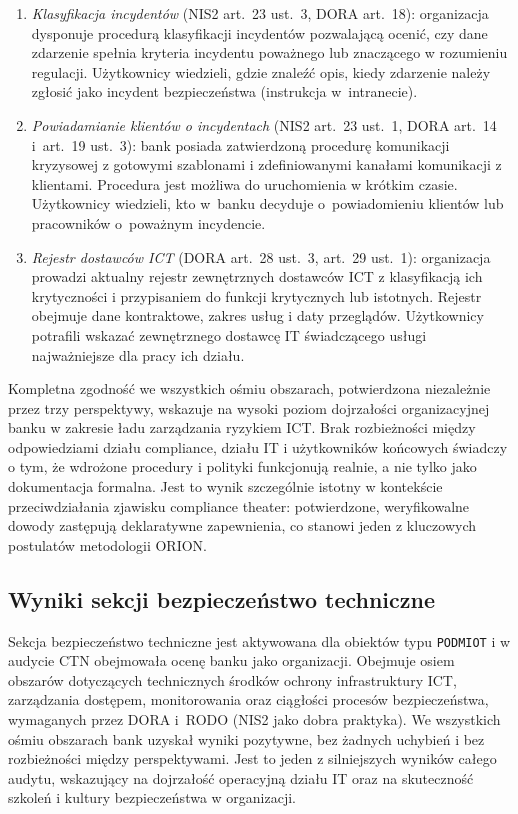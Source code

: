 \begin{enumerate}[label=(\roman*)]
  \item \textit{Klasyfikacja incydentów} (NIS2 art.~23 ust.~3, DORA art.~18): organizacja dysponuje procedurą klasyfikacji incydentów pozwalającą ocenić, czy dane zdarzenie spełnia kryteria incydentu poważnego lub znaczącego w rozumieniu regulacji. Użytkownicy wiedzieli, gdzie znaleźć opis, kiedy zdarzenie należy zgłosić jako incydent bezpieczeństwa (instrukcja w~intranecie).

  \item \textit{Powiadamianie klientów o incydentach} (NIS2 art.~23 ust.~1, DORA art.~14 i~art.~19 ust.~3): bank posiada zatwierdzoną procedurę komunikacji kryzysowej z gotowymi szablonami i zdefiniowanymi kanałami komunikacji z klientami. Procedura jest możliwa do uruchomienia w krótkim czasie. Użytkownicy wiedzieli, kto w~banku decyduje o~powiadomieniu klientów lub pracowników o~poważnym incydencie.

  \item \textit{Rejestr dostawców ICT} (DORA art.~28 ust.~3, art.~29 ust.~1): organizacja prowadzi aktualny rejestr zewnętrznych dostawców ICT z klasyfikacją ich krytyczności i przypisaniem do funkcji krytycznych lub istotnych. Rejestr obejmuje dane kontraktowe, zakres usług i daty przeglądów. Użytkownicy potrafili wskazać zewnętrznego dostawcę IT świadczącego usługi najważniejsze dla pracy ich działu.
\end{enumerate}

Kompletna zgodność we wszystkich ośmiu obszarach, potwierdzona niezależnie przez trzy perspektywy, wskazuje na wysoki poziom dojrzałości organizacyjnej banku w zakresie ładu zarządzania ryzykiem ICT. Brak rozbieżności między odpowiedziami działu compliance, działu IT i użytkowników końcowych świadczy o tym, że wdrożone procedury i polityki funkcjonują realnie, a nie tylko jako dokumentacja formalna. Jest to wynik szczególnie istotny w kontekście przeciwdziałania zjawisku compliance theater: potwierdzone, weryfikowalne dowody zastępują deklaratywne zapewnienia, co stanowi jeden z kluczowych postulatów metodologii ORION.

\subsection{Wyniki sekcji bezpieczeństwo techniczne}

Sekcja bezpieczeństwo techniczne jest aktywowana dla obiektów typu \texttt{PODMIOT} i w audycie CTN obejmowała ocenę banku jako organizacji. Obejmuje osiem obszarów dotyczących technicznych środków ochrony infrastruktury ICT, zarządzania dostępem, monitorowania oraz ciągłości procesów bezpieczeństwa, wymaganych przez DORA i~RODO (NIS2 jako dobra praktyka). We wszystkich ośmiu obszarach bank uzyskał wyniki pozytywne, bez żadnych uchybień i bez rozbieżności między perspektywami. Jest to jeden z silniejszych wyników całego audytu, wskazujący na dojrzałość operacyjną działu IT oraz na skuteczność szkoleń i kultury bezpieczeństwa w organizacji.

